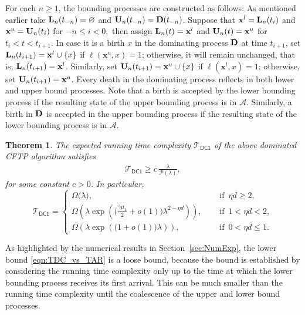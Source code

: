 \documentclass[11pt]{article}
\newcommand{\lt}{\left}
\newcommand{\rt}{\right}
\newcommand{\pno}{\mathcal{P}(\lambda)}
\newcommand{\lfs}{\mathbf{x}}
\newcommand{\comDCone}{\mathcal{T}_{\mathsf{DC1}}}
\newtheorem{theorem}{Theorem}
\begin{document}
For each $n \geq 1$, the bounding processes are constructed as follows: 
As mentioned earlier take ${\mathbf{L}_n(t_{-n}) = \varnothing}$ and ${\mathbf{U}_n(t_{-n}) = \mathbf{D}(t_{-n})}$. Suppose that ${\lfs^l = \mL_n(t_{i})}$  and ${\lfs^u = \mU_n(t_{i})}$ for ${-n \leq i <  0},$
then assign $\mL_n(t) = \lfs^l$  and $\mU_n(t) = \lfs^u$ for $t_{i} < t < t_{i+1}$. In case it is a birth $x$ in
the dominating process $\mathbf{D}$ at time $t_{i+1}$, set $\mL_n(t_{i+1}) = \lfs^l\cup\{ x\}$ if $ \ell(\lfs^u,x) = 1$;
otherwise, it will remain unchanged, that is, $\mL_n(t_{i+1}) = \lfs^l$. Similarly, set $\mU_n(t_{i+1}) = \lfs^u \cup \{ x\}$ if $\ell(\lfs^l,x) = 1$;
otherwise, set $\mU_n(t_{i+1}) = \lfs^u$. Every death in the dominating process reflects in both lower and upper bound processes.
Note that a birth is accepted by the lower bounding  process if the resulting state of the upper bounding  process is in $\mathscr{A}$. Similarly, a birth in $\mathbf{D}$ is accepted in the upper bounding  process if the resulting state of the lower bounding  process is in $\mathscr{A}$.

\begin{theorem}
\label{thm:loss-system}
 The expected running time complexity $\comDCone$ of the above dominated CFTP algorithm satisfies
\begin{align}
\label{eqn:TDC_vs_TAR}
\comDCone \geq c\, \frac{\lambda}{\pno},
\end{align}
for some constant $c > 0$. In particular,
\[
 \comDCone = \begin{cases}
 \varOmega\Big(\lambda\Big), & \quad \text{ if }\, \eta d \geq 2,\\
 \varOmega\lt(\lambda\exp\left(\Big(\frac{\gamma \mu_1}{2} +o(1)\Big)\lambda^{2 - \eta d }\right)\rt), & \quad \text{ if }\, 1 < \eta d < 2,\\
 \varOmega\lt(\lambda\exp \lt(\Big(1 +o(1)\Big)\lambda\rt)\rt),& \quad \text{ if }\,0 < \eta d \leq 1.
 \end{cases}
\]
\end{theorem}

As highlighted by the numerical results in Section~\ref{sec:NumExp}, the lower bound \eqref{eqn:TDC_vs_TAR} is a loose bound, because the bound is established by considering the running time complexity only up to the time at which the
 lower bounding process receives its first arrival. This can be much smaller than the running time complexity until the coalescence of the upper and lower bound processes. 
\end{document}
